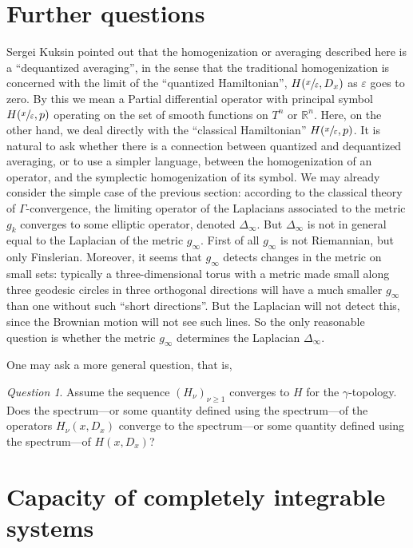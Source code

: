 \documentclass[JEP,XML,SOM,NoFloatCountersInSection,Unicode,published]{cedram}
\numberwithin{equation}{section}
\theoremstyle{plain}
\theoremstyle{definition}
\theoremstyle{remark}
\newtheorem{question}[theorem]{Question}
\begin{document}
\section{Further questions}

Sergei Kuksin pointed out that the homogenization or averaging described here is a ``dequantized averaging'', in the sense that the traditional homogenization is concerned with the limit of the ``quantized Hamiltonian'', $H(\sfrac{x}{ \varepsilon }, D_{x})$ as $ \varepsilon $ goes to zero. By this we mean a Partial differential operator with principal symbol $H (\sfrac{x}{ \varepsilon }, p)$ operating on the set of smooth functions on $T^{n}$ or $ {\mathbb R}^{n}$. Here, on the other hand, we deal directly with the ``classical Hamiltonian'' $H(\sfrac{x}{ \varepsilon }, p)$. It is natural to ask whether there is a connection between quantized and dequantized averaging, or to use a simpler language, between the homogenization of an operator, and the symplectic homogenization of its symbol. We may already consider the simple case of the previous section: according to the classical theory of $\Gamma$-convergence, the limiting operator of the Laplacians associated to the metric $g_{k}$ converges to some elliptic operator, denoted $\Delta_{\infty}$. But $\Delta_{\infty}$ is not in general equal to the Laplacian of the metric $g_{\infty}$. First of all $g_{\infty}$ is not Riemannian, but only Finslerian. Moreover, it seems that $g_{\infty}$ detects changes in the metric on small sets: typically a three-dimensional torus with a metric made small along three geodesic circles in three orthogonal directions will have a much smaller $g_{\infty}$ than one without such ``short directions''. But the Laplacian will not detect this, since the Brownian motion will not see such lines. So the only reasonable question is whether the metric $g_{\infty}$ determines the Laplacian $\Delta_{\infty}$.

One may ask a more general question, that is,

\begin{question}
Assume the sequence $(H_{\nu})_{\nu \geq 1}$ converges to $H$ for the $\gamma$-topology. Does the spectrum---or some quantity defined using the spectrum---of the operators $H_{\nu}(x, D_{x})$ converge to the spectrum---or some quantity defined using the spectrum---of $H(x,D_{x})$?
\end{question}

\appendix
\section{Capacity of completely integrable systems}\label{Appendix-A}
\end{document}

